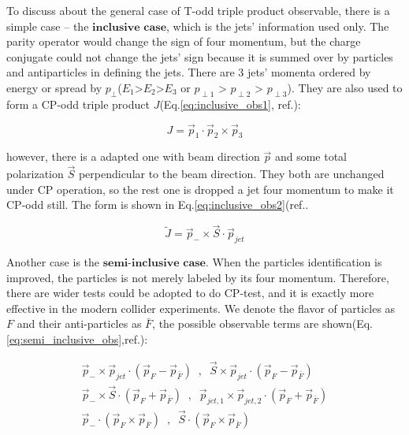 		To discuss about the general case of T-odd triple product observable, there is a simple case -- the $\textbf{inclusive case}$, which is the jets' information used only. The parity operator would change the sign of four momentum, but the charge conjugate could not change the jets' sign because it is summed over by particles and antiparticles in defining the jets. There are 3 jets' momenta ordered by energy or spread by $p_{\perp}$($E_1$>$E_2$>$E_3$ or $p_{\perp 1}$ > $p_{\perp 2}$ > $p_{\perp 3}$). They are also used to form a CP-odd triple product $J$(Eq.\ref{eq:inclusive_obs1}, ref.\cite{PhysRevLett.58.451}):

		\begin{equation}
		J = \vec{p}_1 \cdot \vec{p}_2 \times \vec{p}_3
		\label{eq:inclusive_obs1}
		\end{equation}
		\FloatBarrier

		however, there is a adapted one with beam direction $\vec{p}$ and some total polarization $\vec{S}$ perpendicular to the beam direction. They both are unchanged under CP operation, so the rest one is dropped a jet four momentum to make it CP-odd still. The form is shown in Eq.\ref{eq:inclusive_obs2}(ref.\cite{PhysRevLett.58.451}.

		\begin{equation}
		\widetilde{J} = \vec{p}_- \times \vec{S} \cdot \vec{p}_{jet}
		\label{eq:inclusive_obs2}
		\end{equation}
		\FloatBarrier

		Another case is the $\textbf{semi-inclusive case}$. When the particles identification is improved, the particles is not merely labeled by its four momentum. Therefore, there are wider tests could be adopted to do CP-test, and it is exactly more effective in the modern collider experiments. We denote the flavor of particles as $F$ and their anti-particles as $\bar{F}$, the possible observable terms are shown(Eq.\ref{eq:semi_inclusive_obs},ref.\cite{PhysRevLett.58.451}):

		\begin{equation}
		\begin{split}
		\vec{p}_- \times \vec{p}_{jet} \cdot ( \vec{p}_F - \vec{p}_{\bar{F}} ) \;\;, \;\; \vec{S} \times \vec{p}_{jet} \cdot ( \vec{p}_F - \vec{p}_{\bar{F}} ) \\
		\vec{p}_- \times \vec{S} \cdot ( \vec{p}_F + \vec{p}_{\bar{F}} ) \;\;, \;\; \vec{p}_{jet,1} \times \vec{p}_{jet,2} \cdot ( \vec{p}_F + \vec{p}_{\bar{F}} ) \\
		\vec{p}_- \cdot ( \vec{p}_F \times \vec{p}_{\bar{F}} ) \;\;,\;\; \vec{S} \cdot ( \vec{p}_F \times \vec{p}_{\bar{F}} )
		\label{eq:semi_inclusive_obs}
		\end{split}
		\end{equation}
		\FloatBarrier

